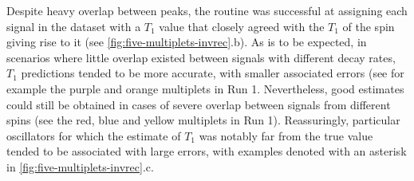 Despite heavy overlap between peaks, the routine was successful at
assigning each signal in the dataset with a $T_1$ value that closely agreed
with the $T_1$ of the spin giving rise to it (see
\cref{fig:five-multiplets-invrec}.b). As is to be
expected, in scenarios where little overlap existed between signals with
different decay rates, $T_1$ predictions tended to be more accurate, with
smaller associated errors (see for example the purple and orange multiplets in Run 1.
Nevertheless, good estimates could still be obtained in cases of severe
overlap between signals from different spins (see the red, blue and yellow
multiplets in Run 1). Reassuringly, particular oscillators for which the
estimate of $T_1$ was notably far from the true value tended to be associated
with large errors, with examples denoted with an asterisk in
\cref{fig:five-multiplets-invrec}.c.

